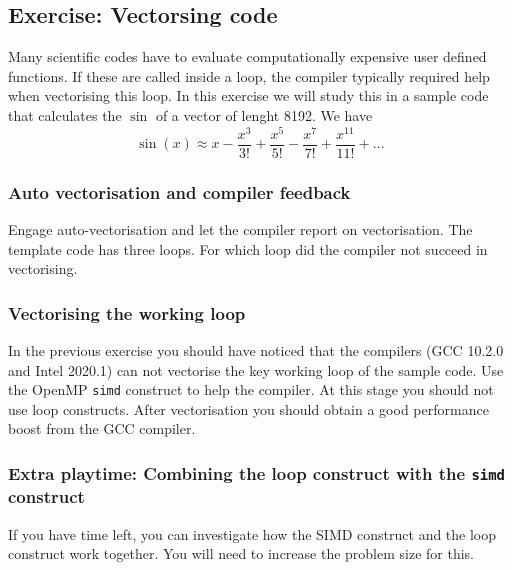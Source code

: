 \subsection{Exercise: Vectorsing code}
Many scientific codes have to evaluate computationally expensive user defined functions.  If these are called inside a loop, the compiler typically required help when vectorising this loop.  In this exercise we will study this in a sample code that calculates the $\sin$ of a vector of lenght 8192.  We have
\begin{equation}
\sin(x) \approx x - \frac{x^3}{3!}  + \frac{x^5}{5!} - \frac{x^7}{7!} + \frac{x^{11}}{11!} + ...
\end{equation}
\subsubsection{Auto vectorisation and compiler feedback}
Engage auto-vectorisation and let the compiler report on vectorisation.  The template code has three loops.  For which loop did the compiler not succeed in vectorising.
\subsubsection{Vectorising the working loop}
In the previous exercise you should have noticed that the compilers (GCC 10.2.0 and Intel 2020.1) can not vectorise the key working loop of the sample code.  Use the OpenMP \verb+simd+ construct to help the compiler.  At this stage you should not use loop constructs.
After vectorisation you should obtain a good performance  boost from the GCC compiler.

\subsubsection{Extra playtime: Combining the loop construct with the {\tt simd} construct}
If you have time left, you can investigate how the SIMD construct and the loop construct work together.   You will need to increase the problem size for this.
